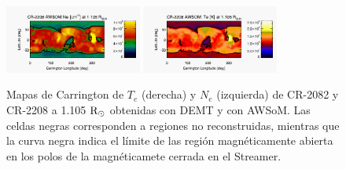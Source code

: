 \documentclass[baaa]{baaa}
\begin{document}
\begin{figure}
  \includegraphics[width=0.4\textwidth]{figuras/map_Ne_awsom_2208_185_short_1105_Rsun.jpg}
  \includegraphics[width=0.4\textwidth]{figuras/map_Te_awsom_2208_185_short_1105_Rsun.jpg}
    \caption{Mapas de Carrington de $T_e$ (derecha) y $N_e$ (izquierda) de CR-2082 y CR-2208 a 1.105 ${\rm R_\odot}$ obtenidas con DEMT y con AWSoM. Las celdas negras corresponden a regiones no reconstruidas, mientras que la curva negra indica el límite de las región magnéticamente abierta en los polos de la magnéticamete cerrada en el Streamer.}
  \label{fig-carrington}
\end{figure}


\end{document}

